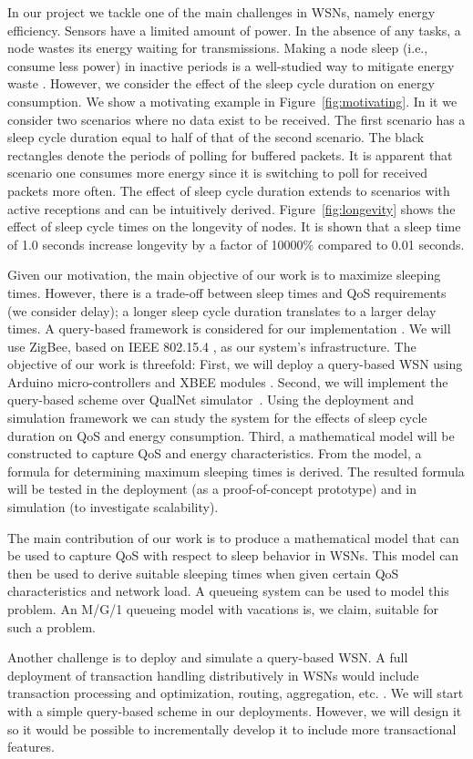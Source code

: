 In our project we tackle one of the main challenges in WSNs, namely energy efficiency. Sensors have a limited amount of power. In the absence of any tasks, a node wastes its energy waiting for transmissions. Making a node sleep (i.e., consume less power) in inactive periods is a well-studied way to mitigate energy waste \cite{1}. However, we consider the effect of the sleep cycle duration on energy consumption. We show a motivating example in Figure~\ref{fig:motivating}. In it we consider two scenarios where no data exist to be received. The first scenario has a sleep cycle duration equal to half of that of the second scenario. The black rectangles denote the periods of polling for buffered packets. It is apparent that scenario one consumes more energy since it is switching to poll for received packets more often. The effect of sleep cycle duration extends to scenarios with active receptions and can be intuitively derived.  Figure~\ref{fig:longevity} shows the effect of sleep cycle times on the longevity of nodes. It is shown that a sleep time of 1.0 seconds increase longevity by a factor of 10000\% compared to 0.01 seconds.

Given our motivation, the main objective of our work is to maximize sleeping times. However, there is a trade-off between sleep times and QoS requirements (we consider delay); a longer sleep cycle duration translates to a larger delay times. A query-based framework is considered for our implementation \cite{2}. We will use ZigBee, based on IEEE 802.15.4 \cite{3}, as our system's infrastructure. The objective of our work is threefold: First, we will deploy a query-based WSN using Arduino micro-controllers \cite{17} and XBEE modules \cite{18}. Second, we will implement the query-based scheme over QualNet simulator~\cite{16}. Using the deployment and simulation framework we can study the system for the effects of sleep cycle duration on QoS and energy consumption. Third, a mathematical model will be constructed to capture QoS and energy characteristics. From the model, a formula for determining maximum sleeping times is derived. The resulted formula will be tested in the deployment (as a proof-of-concept prototype) and in simulation (to investigate scalability).

The main contribution of our work is to produce a mathematical model that can be used to capture QoS with respect to sleep behavior in WSNs. This model can then be used to derive suitable sleeping times when given certain QoS characteristics and network load. A queueing system \cite{21} can be used to model this problem. An M/G/1 queueing model with vacations \cite{20} is, we claim, suitable for such a problem.

Another challenge is to deploy and simulate a query-based WSN. A full deployment of transaction handling distributively in WSNs would include transaction processing and optimization, routing, aggregation, etc. \cite{2}. We will start with a simple query-based scheme in our deployments. However, we will design it so it would be possible to incrementally develop it to include more transactional features. 
